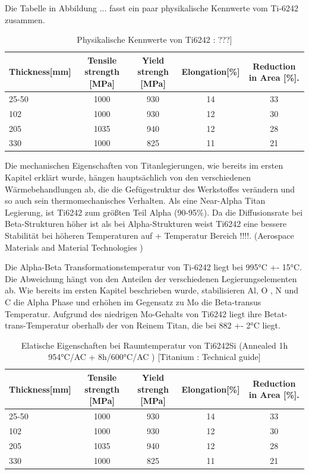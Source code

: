 Die Tabelle in Abbildung ... fasst ein paar physikalische Kennwerte vom Ti-6242 zusammen.

\begin{table}[H]
	\centering	
	\begin{tabular}{|l |c |c|c |c|}
		\hline
		\centering
		Thickness[mm] & Tensile strength [MPa] & Yield strengh [MPa] & Elongation[\%]& Reduction in Area [\%]. \\
		\hline
		25-50&1000&930&14&33\\
		102&1000&930&12&30\\
		205&1035&940&12&28\\
		330&1000&825&11&21\\
		
		\hline
	\end{tabular}
	\caption{Physikalische Kennwerte von Ti6242 : ???]}
\end{table}


Die mechanischen Eigenschaften von Titanlegierungen, wie bereits im ersten Kapitel erklärt wurde, hängen hauptsächlich von den verschiedenen Wärmebehandlungen ab, die die Gefügestruktur des Werkstoffes  verändern und so auch sein thermomechanisches Verhalten.
Als eine Near-Alpha Titan Legierung, ist Ti6242 zum größten Teil Alpha (90-95\%). Da die Diffusionsrate bei Beta-Strukturen höher ist als bei Alpha-Strukturen weist Ti6242 eine bessere Stabilität bei höheren Temperaturen auf + Temperatur Bereich !!!!. (Aerospace Materials and Material Technologies ) 

Die Alpha-Beta Transformationstemperatur von Ti-6242 liegt bei 995°C +- 15°C. Die Abweichung hängt  von den Anteilen der verschiedenen Legierungselementen ab. Wie bereits im ersten Kapitel beschrieben wurde, stabilisieren  Al, O , N und C die Alpha Phase und erhöhen im Gegensatz zu Mo die Beta-transus Temperatur.
Aufgrund des niedrigen Mo-Gehalts von Ti6242 liegt ihre Betat-trans-Temperatur oberhalb der von Reinem Titan, die bei 882 +- 2°C liegt.


\begin{table}[H]
	\small
	\tabcolsep=0.11cm
	\centering	
	\begin{tabular}{|l |c |c|c |c|}
		\hline
		\centering
		Thickness[mm] & Tensile strength [MPa] & Yield strengh [MPa] & Elongation[\%]& Reduction in Area [\%]. \\
		\hline
		25-50&1000&930&14&33\\
		102&1000&930&12&30\\
		205&1035&940&12&28\\
		330&1000&825&11&21\\
		
		\hline
	\end{tabular}
	\caption{Elatische Eigenschaften bei Raumtemperatur von Ti6242Si (Annealed 1h 954°C/AC + 8h/600°C/AC )  [Titanium : Technical guide]}
	\label{Mecprop}
\end{table}






